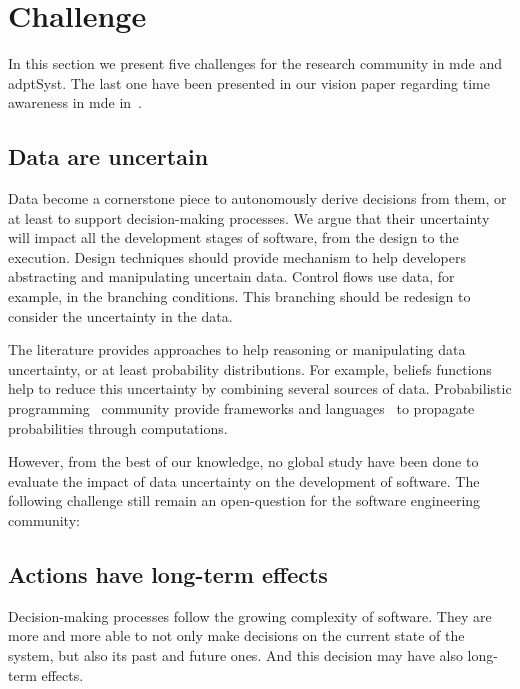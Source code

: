 \section{Challenge}

In this section we present five challenges for the research community in \gls{mde} and \gls{adptSyst}.
The last one have been presented in our vision paper regarding time awareness in \gls{mde} in~\cite{DBLP:conf/models/Benelallam0MFBB17}.

\subsection{Data are uncertain}
\label{intro:challenges:u-data}
Data become a cornerstone piece to autonomously derive decisions from them, or at least to support decision-making processes.
We argue that their uncertainty will impact all the development stages of software, from the design to the execution.
Design techniques should provide mechanism to help developers abstracting and manipulating uncertain data.
Control flows use data, for example, in the branching conditions.
This branching should be redesign to consider the uncertainty in the data.

The literature provides approaches to help reasoning or manipulating data uncertainty, or at least probability distributions.
For example, beliefs functions~\cite{shafer1992dempster} help to reduce this uncertainty by combining several sources of data.
Probabilistic programming~\cite{DBLP:conf/icse/GordonHNR14} community provide frameworks and languages~\cite{url:InferNET18, baudin2017openturns} to propagate probabilities through computations.

However, from the best of our knowledge, no global study have been done to evaluate the impact of data uncertainty on the development of software.
The following challenge still remain an open-question for the software engineering community:
\vspace{-2em}

\subsection{Actions have long-term effects}
\label{intro:challenges:long-term-act}
Decision-making processes follow the growing complexity of software.
They are more and more able to not only make decisions on the current state of the system, but also its past and future ones.
And this decision may have also long-term effects.

